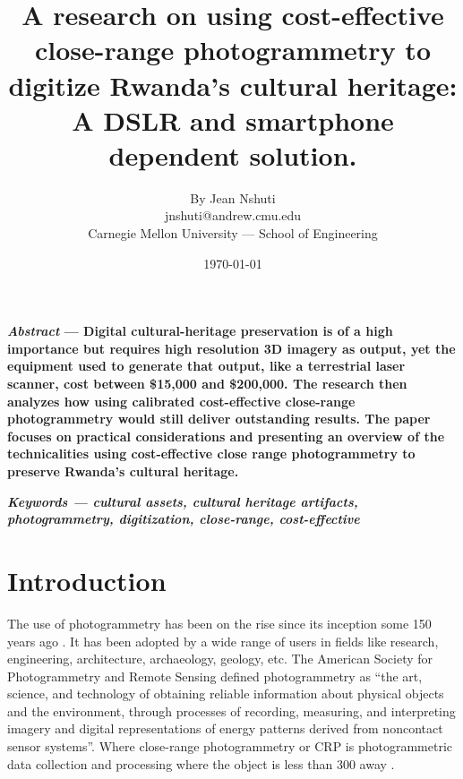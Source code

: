 \documentclass[a4paper, 12pt]{article}
\begin{document}
\title{\Large{\textbf{A research on using cost-effective close-range photogrammetry to digitize Rwanda's cultural heritage: A DSLR and smartphone dependent solution.}}}
\author{By Jean Nshuti \\ jnshuti@andrew.cmu.edu \\ Carnegie Mellon University — School of Engineering}
\date{\today}
\maketitle


\textbf{\textit{Abstract} — Digital cultural-heritage preservation is of a high importance but requires high resolution 3D imagery as output, yet the equipment used to generate that output, like a terrestrial laser scanner, cost between \$15,000 and \$200,000. The research then analyzes how using calibrated cost-effective close-range photogrammetry would still deliver outstanding results. The paper focuses on practical considerations and presenting an overview of the technicalities using cost-effective close range photogrammetry to preserve Rwanda's cultural heritage. \\}

\textbf{\textit{Keywords — cultural assets, cultural heritage artifacts, photogrammetry, digitization, close-range, cost-effective}}

\section{\textbf{Introduction}}
The use of photogrammetry has been on the rise since its inception some 150 years ago \cite{histphtgm}. It has been adopted by a wide range of users in fields
like research, engineering, architecture, archaeology, geology, etc.
The  American Society for Photogrammetry and Remote Sensing defined photogrammetry as \cite{Ebert2015} “the art, science, and technology
of obtaining reliable information about physical objects and the environment, through processes of recording, measuring,
and interpreting imagery and digital representations of energy patterns derived from noncontact sensor systems”. Where close-range photogrammetry or CRP is photogrammetric data collection and processing where the object is less than 300 away \cite{crp}. \\
\end{document}
